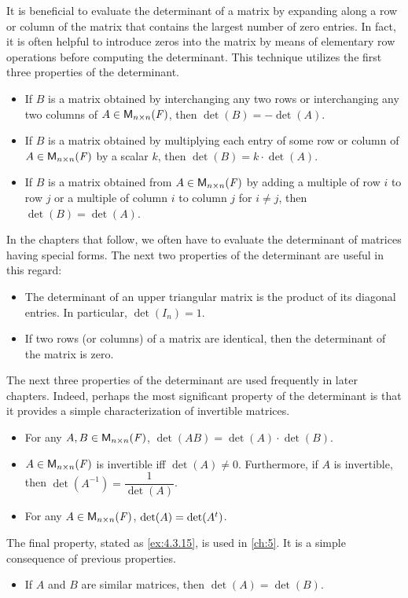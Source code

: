 \begin{note}
  It is beneficial to evaluate the determinant of a matrix by expanding along a row or column of the matrix that contains the largest number of zero entries.
  In fact, it is often helpful to introduce zeros into the matrix by means of elementary row operations before computing the determinant.
  This technique utilizes the first three properties of the determinant.
  \begin{itemize}
    \item If \(B\) is a matrix obtained by interchanging any two rows or interchanging any two columns of \(A \in \ms[n][n][\F]\), then \(\det(B) = -\det(A)\).
    \item If \(B\) is a matrix obtained by multiplying each entry of some row or column of \(A \in \ms[n][n][\F]\) by a scalar \(k\), then \(\det(B) = k \cdot \det(A)\).
    \item If \(B\) is a matrix obtained from \(A \in \ms[n][n][\F]\) by adding a multiple of row \(i\) to row \(j\) or a multiple of column \(i\) to column \(j\) for \(i \neq j\), then \(\det(B) = \det(A)\).
  \end{itemize}
  In the chapters that follow, we often have to evaluate the determinant of matrices having special forms.
  The next two properties of the determinant are useful in this regard:
  \begin{itemize}
    \item The determinant of an upper triangular matrix is the product of its diagonal entries.
          In particular, \(\det(I_n) = 1\).
    \item If two rows (or columns) of a matrix are identical, then the determinant of the matrix is zero.
  \end{itemize}
  The next three properties of the determinant are used frequently in later chapters.
  Indeed, perhaps the most significant property of the determinant is that it provides a simple characterization of invertible matrices.
  \begin{itemize}
    \item For any \(A, B \in \ms[n][n][\F]\), \(\det(AB) = \det(A) \cdot \det(B)\).
    \item \(A \in \ms[n][n][\F]\) is invertible iff \(\det(A) \neq 0\).
          Furthermore, if \(A\) is invertible, then \(\det(A^{-1}) = \dfrac{1}{\det(A)}\).
    \item For any \(A \in \ms[n][n][\F]\), \(\det(A) = \det({A}^{t})\).
  \end{itemize}
  The final property, stated as \cref{ex:4.3.15}, is used in \cref{ch:5}.
  It is a simple consequence of previous properties.
  \begin{itemize}
    \item If \(A\) and \(B\) are similar matrices, then \(\det(A) = \det(B)\).
  \end{itemize}
\end{note}

